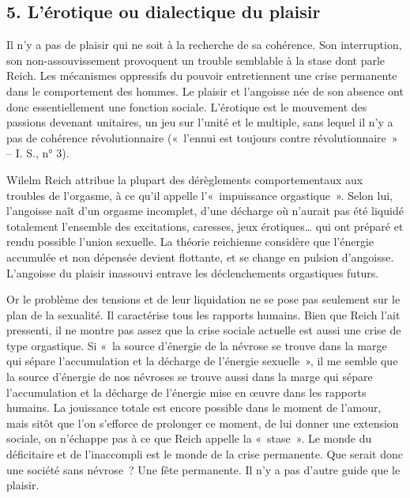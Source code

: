 \documentclass[french,twoside]{book} %
\newcommand{\astermono}{\medskip\centerline{\color{rubric}\large\selectfont{\syms ✻}}\medskip\par}%
\begin{document}
\subsection[{5. L’érotique ou dialectique du plaisir}]{\textsc{5. }L’érotique ou dialectique du plaisir}
\noindent Il n’y a pas de plaisir qui ne soit à la recherche de sa cohérence. Son interruption, son non-assouvissement provoquent un trouble semblable à la stase dont parle Reich. Les mécanismes oppressifs du pouvoir entretiennent une crise permanente dans le comportement des hommes. Le plaisir et l’angoisse née de son absence ont donc essentiellement une fonction sociale. L’érotique est le mouvement des passions devenant unitaires, un jeu sur l’unité et le multiple, sans lequel il n’y a pas de cohérence révolutionnaire (« l’ennui est toujours contre révolutionnaire » – I. S., n° 3).\par
Wilelm Reich attribue la plupart des dérèglements comportementaux aux troubles de l’orgasme, à ce qu’il appelle l’« impuissance orgastique ». Selon lui, l’angoisse naît d’un orgasme incomplet, d’une décharge où n’aurait pas été liquidé totalement l’ensemble des excitations, caresses, jeux érotiques… qui ont préparé et rendu possible l’union sexuelle. La théorie reichienne considère que l’énergie accumulée et non dépensée devient flottante, et se change en pulsion d’angoisse. L’angoisse du plaisir inassouvi entrave les déclenchements orgastiques futurs.\par
Or le problème des tensions et de leur liquidation ne se pose pas seulement sur le plan de la sexualité. Il caractérise tous les rapports humains. Bien que Reich l’ait pressenti, il ne montre pas assez que la crise sociale actuelle est aussi une crise de type orgastique. Si « la source d’énergie de la névrose se trouve dans la marge qui sépare l’accumulation et la décharge de l’énergie sexuelle », il me semble que la source d’énergie de nos névroses se trouve aussi dans la marge qui sépare l’accumulation et la décharge de l’énergie mise en œuvre dans les rapports humains. La jouissance totale est encore possible dans le moment de l’amour, mais sitôt que l’on s’efforce de prolonger ce moment, de lui donner une extension sociale, on n’échappe pas à ce que Reich appelle la « stase ». Le monde du déficitaire et de l’inaccompli est le monde de la crise permanente. Que serait donc une société sans névrose ? Une fête permanente. Il n’y a pas d’autre guide que le plaisir.\par

\astermono
\end{document}
